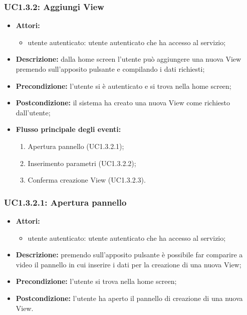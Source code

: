 \subsubsection{UC1.3.2: Aggiungi View}

\begin{itemize}
	\item \textbf{Attori:}
	\begin{itemize}
		\item utente autenticato: utente autenticato che ha accesso al servizio;
	\end{itemize}
	\item \textbf{Descrizione:} dalla home screen l'utente può aggiungere una nuova View premendo sull'apposito pulsante e compilando i dati richiesti;
	\item \textbf{Precondizione:} l'utente si è autenticato e si trova nella home screen;
	\item \textbf{Postcondizione:} il sistema ha creato una nuova View come richiesto dall'utente;
	\item \textbf{Flusso principale degli eventi:}
	\begin{enumerate}
		\item Apertura pannello (UC1.3.2.1);
		\item Inserimento parametri (UC1.3.2.2);
		\item Conferma creazione View (UC1.3.2.3).
	\end{enumerate}
\end{itemize}

\subsubsection{UC1.3.2.1: Apertura pannello}

\begin{itemize}
	\item \textbf{Attori:}
	\begin{itemize}
		\item utente autenticato: utente autenticato che ha accesso al servizio;
	\end{itemize}
	\item \textbf{Descrizione:} premendo sull'apposito pulsante è possibile far comparire a video il pannello in cui inserire i dati per la creazione di una nuova View;
	\item \textbf{Precondizione:} l'utente si trova nella home screen;
	\item \textbf{Postcondizione:} l'utente ha aperto il pannello di creazione di una nuova View.
\end{itemize}

